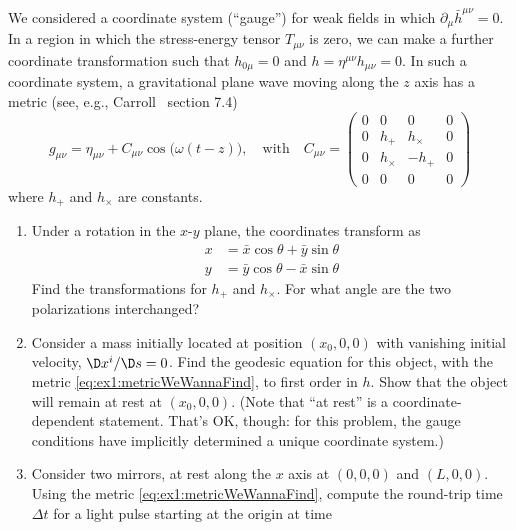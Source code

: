 \begin{exercises}
\begin{xca}
We considered a coordinate system (``gauge'') for weak fields in
which $\partial_{\mu}\bar{h}^{\mu\nu}=0$. In a region in which the
  stress-energy tensor $T_{\mu\nu}$ is zero, we can make a
  further coordinate transformation such that $h_{0\mu}=0$ and
  $h=\eta^{\mu\nu}h_{\mu\nu}=0$. In such a coordinate system, a
  gravitational plane wave moving along the $z$ axis has a metric
  (see, e.g., Carroll~\cite{Carroll:2004st} section 7.4) 
\begin{equation}\label{eq:ex1:metricWeWannaFind}
g_{\mu\nu}=\eta_{\mu\nu}+C_{\mu\nu}\cos\bigl(\omega(t-z)\bigr),
\quad\mbox{with}\quad
C_{\mu\nu} = \begin{pmatrix} 0 & 0 & 0 & 0\\
0 & h_{+} & h_{\times} & 0\\
0 & h_{\times} & -h_{+} & 0\\
0 &0 & 0 & 0
\end{pmatrix}
\end{equation}
where $h_{+}$ and $h_{\times}$ are constants.
\begin{enumerate}
\item Under a rotation in the $x$-$y$ plane, the coordinates transform as
\begin{equation}
\begin{aligned}
x &= \bar{x}\cos\theta + \bar{y}\sin\theta\\
y &= \bar{y}\cos\theta - \bar{x}\sin\theta
\end{aligned}
\end{equation}
Find the transformations for $h_{+}$ and $h_{\times}$. For what
angle are the two polarizations interchanged? 
\item Consider a mass initially located at position $(x_{0}, 0,
  0)$ with vanishing initial velocity, $\D x^i /\D s = 0$. Find
  the geodesic equation for this object, with the metric
  \eqref{eq:ex1:metricWeWannaFind}, to first order in $h$. Show
  that the object will remain at rest at $(x_{0}, 0, 0)$. (Note
  that ``at rest'' is a coordinate-dependent statement. That's
  OK, though: for this problem, the gauge conditions have
  implicitly determined a unique coordinate system.) 
\item\label{ex1:partC:lot8} Consider two mirrors, at rest along the $x$ axis at $(0, 0,
  0)$ and $(L, 0, 0)$. Using the metric
  \eqref{eq:ex1:metricWeWannaFind}, compute the round-trip time
  $\Delta t$ for a light pulse starting at the origin at time

\end{enumerate}
\end{xca}
\end{exercises}

